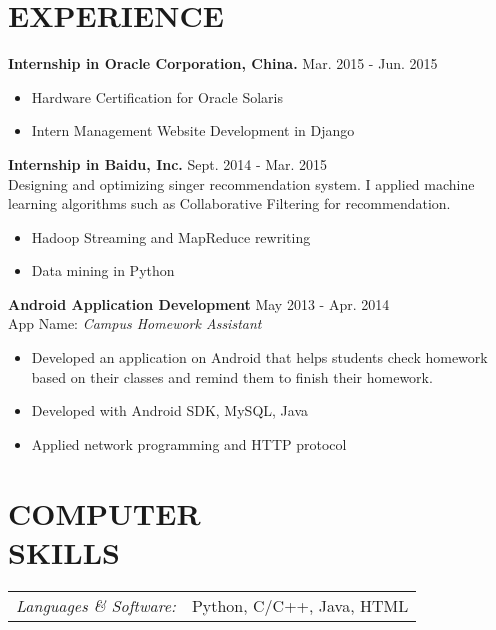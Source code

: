 \documentclass[margin,10pt]{res} %
\begin{document}
\begin{resume}
\section{EXPERIENCE}
\leftmargini=4mm
{\bf Internship in Oracle Corporation, China.} \hfill Mar. 2015 - Jun. 2015 
\begin{itemize}
\item Hardware Certification for Oracle Solaris
\item Intern Management Website Development in Django
\end{itemize}

{\bf Internship in Baidu, Inc.} \hfill Sept. 2014 - Mar. 2015 \\
Designing and optimizing singer recommendation system. I applied machine learning algorithms such as Collaborative Filtering for recommendation.

\begin{itemize}  %
\item Hadoop Streaming and MapReduce rewriting
\item Data mining in Python
\end{itemize}

{\bf Android Application Development} \hfill May 2013 - Apr. 2014 \\
App Name: \textit{Campus Homework Assistant}
\begin{itemize}
\item Developed an application on Android that helps students check homework based on their classes and remind them to finish their homework.
\item Developed with Android SDK, MySQL, Java
\item Applied network programming and HTTP protocol
\end{itemize}


\section{COMPUTER \\ SKILLS}
\begin{tabular}{rl}
{\sl Languages \& Software:}
& Python, C/C++, Java,  HTML \\
\end{tabular}


\end{resume}
\end{document}
